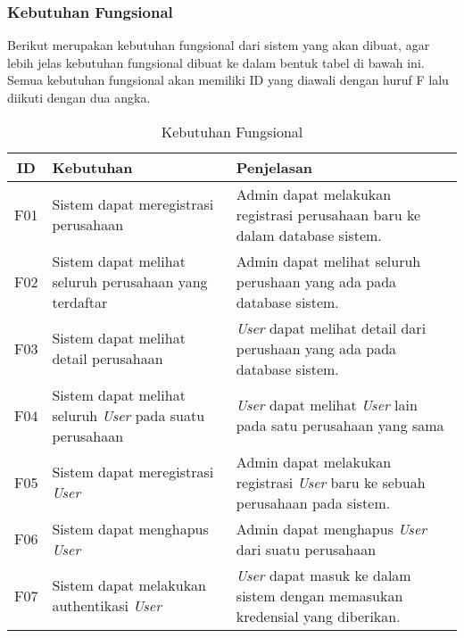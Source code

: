\subsubsection{Kebutuhan Fungsional}
Berikut merupakan kebutuhan fungsional dari sistem yang akan dibuat, agar lebih jelas kebutuhan fungsional dibuat ke dalam bentuk tabel di bawah ini. Semua kebutuhan fungsional akan memiliki ID yang diawali dengan huruf F lalu diikuti dengan dua angka.

\begin{table}
  \caption{Kebutuhan Fungsional}
  \label{tab:kebutuhan-fungsional}
  \centering
  \begin{tabular}{|c|p{4.5cm}|p{8cm}|}
    \hline
    ID  & Kebutuhan                                                                      & Penjelasan                                                                                                      \\
    \hline
    F01 & Sistem dapat meregistrasi perusahaan                                           & Admin dapat melakukan registrasi perusahaan baru ke dalam database sistem.                                      \\
    \hline
    F02 & Sistem dapat melihat seluruh perusahaan yang terdaftar                         & Admin dapat melihat seluruh perushaan yang ada pada database sistem.                                            \\
    \hline
    F03 & Sistem dapat melihat detail perusahaan                                         & \textit{User} dapat melihat detail dari perushaan yang ada pada database sistem.                                \\
    \hline
    F04 & Sistem dapat melihat seluruh \textit{User} pada suatu perusahaan               & \textit{User} dapat melihat \textit{User} lain pada satu perusahaan yang sama                                   \\
    \hline
    F05 & Sistem dapat meregistrasi \textit{User}                                        & Admin dapat melakukan registrasi \textit{User} baru ke sebuah perusahaan pada sistem.                           \\
    \hline
    F06 & Sistem dapat menghapus \textit{User}                                           & Admin dapat menghapus \textit{User} dari suatu perusahaan                                                       \\
    \hline
    F07 & Sistem dapat melakukan authentikasi \textit{User}                              & \textit{User} dapat masuk ke dalam sistem dengan memasukan kredensial yang diberikan.                           \\

\end{tabular}
\end{table}

